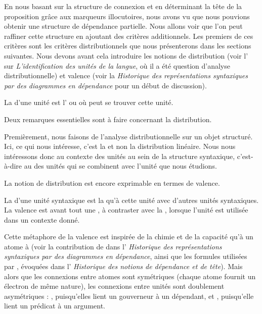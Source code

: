 En nous basant sur la structure de connexion et en déterminant la tête de la proposition grâce aux marqueurs illocutoires, nous avons vu que nous pouvions obtenir une structure de dépendance partielle. Nous allons voir que l’on peut raffiner cette structure en ajoutant des critères additionnels. Les premiers de ces critères sont les critères distributionnels que nous présenterons dans les sections suivantes. Nous devons avant cela introduire les notions de distribution (voir l' sur \textit{L’identification des unités de la langue}, où il a été question d’analyse distributionnelle) et valence (voir la  \textit{Historique des représentations syntaxiques par des diagrammes en dépendance} pour un début de discussion).

{La  d’une unité est l’ ou  où peut se trouver cette unité.}

Deux remarques essentielles sont à faire concernant la distribution.

Premièrement, nous faisons de l’analyse distributionnelle sur un objet structuré. Ici, ce qui nous intéresse, c’est la  et non la distribution linéaire. Nous nous intéressons donc au contexte des unités au sein de la structure syntaxique, c’est-à-dire au  des unités qui se combinent avec l’unité que nous étudions.

La notion de distribution est encore exprimable en termes de valence.

{La  d’une unité syntaxique est la  qu’à cette unité  avec d’autres unités syntaxiques. La valence est avant tout une , à contraster avec la , lorsque l’unité est utilisée dans un contexte donné.}

Cette métaphore de la valence est inspirée de la chimie et de la capacité qu’à un atome à  (voir la contribution de \citet{Peirce1897} dans l’ \textit{Historique des représentations syntaxiques par des diagrammes en dépendance}, ainsi que les formules utilisées par \citet{jespersen1937analytic}, évoquées dans l’ \textit{Historique des notions de dépendance et de tête}). Mais alors que les connexions entre atomes sont symétriques (chaque atome fournit un électron de même nature), les connexions entre unités sont doublement asymétriques : , puisqu’elles lient un gouverneur à un dépendant, et , puisqu’elle lient un prédicat à un argument.

